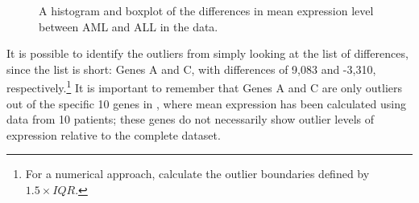 \begin{figure}[h]
	\centering
	\caption{A histogram and boxplot of the differences in mean expression level between AML and ALL in the  data.}
	\label{golubSmallHistandBox}
\end{figure}

It is possible to identify the outliers from simply looking at the list of differences, since the list is short: Genes A and C, with differences of 9,083 and -3,310, respectively.\footnote{For a numerical approach, calculate the outlier boundaries defined by $1.5 \times IQR$.} It is important to remember that Genes A and C are only outliers out of the specific 10 genes in , where mean expression has been calculated using data from 10 patients; these genes do not necessarily show outlier levels of expression relative to the complete dataset.

